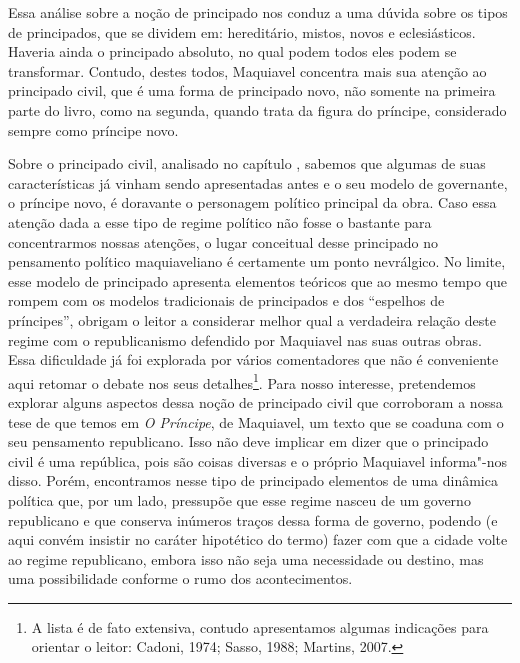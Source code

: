 Essa análise sobre a noção de principado nos conduz a uma dúvida sobre
os tipos de principados, que se dividem em: hereditário, mistos, novos e
eclesiásticos. Haveria ainda o principado absoluto, no qual podem todos
eles podem se transformar. Contudo, destes todos, Maquiavel concentra
mais sua atenção ao principado civil, que é uma forma de principado
novo, não somente na primeira parte do livro, como na segunda, quando
trata da figura do príncipe, considerado sempre como príncipe novo.

Sobre o principado civil, analisado no capítulo , sabemos que algumas
de suas características já vinham sendo apresentadas antes e o seu
modelo de governante, o príncipe novo, é doravante o personagem político
principal da obra. Caso essa atenção dada a esse tipo de regime político
não fosse o bastante para concentrarmos nossas atenções, o lugar
conceitual desse principado no pensamento político maquiaveliano é
certamente um ponto nevrálgico. No limite, esse modelo de principado
apresenta elementos teóricos que ao mesmo tempo que rompem com os
modelos tradicionais de principados e dos ``espelhos de príncipes'',
obrigam o leitor a considerar melhor qual a verdadeira relação deste
regime com o republicanismo defendido por Maquiavel nas suas outras
obras. Essa dificuldade já foi explorada por vários comentadores que não
é conveniente aqui retomar o debate nos seus detalhes\footnote{A lista é
  de fato extensiva, contudo apresentamos algumas indicações para
  orientar o leitor: Cadoni, 1974; Sasso, 1988; Martins, 2007.}. Para nosso
interesse, pretendemos explorar alguns aspectos dessa noção de
principado civil que corroboram a nossa tese de que temos em \emph{O
Príncipe}, de Maquiavel, um texto que se coaduna com o seu pensamento
republicano. Isso não deve implicar em dizer que o principado civil é
uma república, pois são coisas diversas e o próprio Maquiavel
informa"-nos disso. Porém, encontramos nesse tipo de principado elementos
de uma dinâmica política que, por um lado, pressupõe que esse regime
nasceu de um governo republicano e que conserva inúmeros traços dessa
forma de governo, podendo (e aqui convém insistir no caráter hipotético
do termo) fazer com que a cidade volte ao regime republicano, embora
isso não seja uma necessidade ou destino, mas uma possibilidade conforme
o rumo dos acontecimentos.

